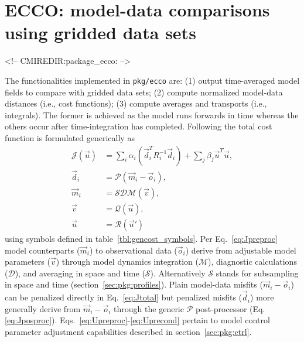 \section{ECCO: model-data comparisons using gridded data sets}
\label{sec:pkg:ecco}
\begin{rawhtml}
<!-- CMIREDIR:package_ecco: -->
\end{rawhtml}

\def\mitgcmCheckpointVersion{65z}

The functionalities implemented in \texttt{pkg/ecco} are: (1) output time-averaged model fields to compare with gridded data sets; (2) compute normalized model-data distances (i.e., cost functions); (3) compute averages and transports (i.e., integrals). The former is achieved as the model runs forwards in time whereas the others occur after time-integration has completed. Following \cite{for-eta:15} the total cost function is formulated generically as
\begin{align} 
	\mathcal{J}(\vec{u}) &= \sum_i \alpha_i \left(\vec{d}_i^T R_i^{-1} \vec{d}_i\right) + \sum_j \beta_j \vec{u}^T\vec{u}, \label{eq:Jtotal} \\
	\vec{d}_i &= \mathcal{P}(\vec{m}_i - \vec{o}_i), \label{eq:Jposproc} \\
	\vec{m}_i &= \mathcal{S}\mathcal{D}\mathcal{M}(\vec{v}), \label{eq:Jpreproc} \\
	\vec{v}	  &= \mathcal{Q}(\vec{u}), \label{eq:Upreproc} \\
	\vec{u}	  &= \mathcal{R}(\vec{u}') \label{eq:Uprecond}
\end{align}
using symbols defined in table~\ref{tbl:gencost_symbols}. Per Eq.~\eqref{eq:Jpreproc} model counterparts ($\vec{m}_i$) to observational data ($\vec{o}_i$) derive from adjustable model parameters ($\vec{v}$) through model dynamics integration ($\mathcal{M}$), diagnostic calculations ($\mathcal{D}$), and averaging in space and time ($\mathcal{S}$). Alternatively $\mathcal{S}$ stands for subsampling in space and time (section~\ref{sec:pkg:profiles}). Plain model-data misfits ($\vec{m}_i-\vec{o}_i$) can be penalized directly in Eq.~\eqref{eq:Jtotal} but penalized misfits ($\vec{d}_i$) more generally derive from $\vec{m}_i-\vec{o}_i$ through the generic $\mathcal{P}$ post-processor (Eq. \eqref{eq:Jposproc}). Eqs.~\eqref{eq:Upreproc}-\eqref{eq:Uprecond} pertain to model control parameter adjustment capabilities described in section~\ref{sec:pkg:ctrl}.

